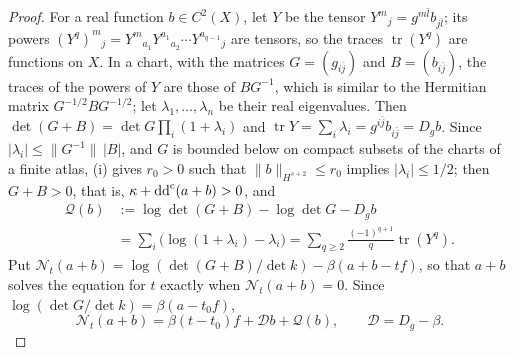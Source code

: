 \begin{proof}
For a real function $b\in C^2(X)$, let $Y$ be the tensor $Y^m{}_j=g^{m\bar l}b_{j\bar l}$; its powers $(Y^q)^m{}_j=Y^m{}_{a_1}Y^{a_1}{}_{a_2}\cdots Y^{a_{q-1}}{}_j$ are tensors, so the traces $\operatorname{tr}(Y^q)$ are functions on $X$. In a chart, with the matrices $G=(g_{i\bar j})$ and $B=(b_{i\bar j})$, the traces of the powers of $Y$ are those of $BG^{-1}$, which is similar to the Hermitian matrix $G^{-1/2}BG^{-1/2}$; let $\lambda_1,\ldots,\lambda_n$ be their real eigenvalues. Then $\det(G+B)=\det G\prod_i(1+\lambda_i)$ and $\operatorname{tr}Y=\sum_i\lambda_i=g^{i\bar j}b_{i\bar j}=D_gb$. Since $|\lambda_i|\leq\|G^{-1}\|\,|B|$, and $G$ is bounded below on compact subsets of the charts of a finite atlas, (i) gives $r_0>0$ such that $\|b\|_{H^{s+2}}\leq r_0$ implies $|\lambda_i|\leq1/2$; then $G+B>0$, that is, $\kappa+\mathrm{dd}^{\mathrm{c}}(a+b)>0$, and
\[
 \begin{aligned}
 \mathcal Q(b)&:=\log\det(G+B)-\log\det G-D_gb\\
 &=\sum_i\bigl(\log(1+\lambda_i)-\lambda_i\bigr)=\sum_{q\geq2}\frac{(-1)^{q+1}}q\operatorname{tr}(Y^q).
 \end{aligned}
\]
Put $\mathcal N_t(a+b)=\log(\det(G+B)/\det k)-\beta(a+b-tf)$, so that $a+b$ solves the equation for $t$ exactly when $\mathcal N_t(a+b)=0$. Since $\log(\det G/\det k)=\beta(a-t_0f)$,
\[
 \mathcal N_t(a+b)=\beta(t-t_0)f+\mathcal Db+\mathcal Q(b),
 \qquad \mathcal D=D_g-\beta.
\]


\end{proof}
